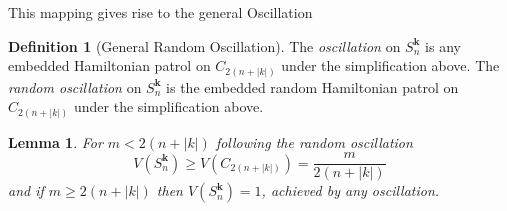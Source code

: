 \documentclass[a4paper,10pt]{article}
\newtheorem{lemma}[theorem]{Lemma}
\theoremstyle{definition}
\newtheorem{definition}[theorem]{Definition}
\theoremstyle{definition}
\theoremstyle{remark}
\theoremstyle{definition}
\begin{document}
This mapping gives rise to the general Oscillation

\begin{definition}[General Random Oscillation]
The \textit{oscillation} on $S^{\bm{k}}_{n}$ is any embedded Hamiltonian patrol on $C_{2(n+|k|)}$ under the simplification above. The \textit{random oscillation} on $S^{\bm{k}}_{n}$ is the embedded random Hamiltonian patrol on $C_{2(n+|k|)}$ under the simplification above.
\end{definition}

\begin{lemma}
For $m < 2(n+|k|)$ following the random oscillation
$$V(S^{\bm{k}}_{n}) \geq V(C_{2(n+|k|)})=\frac{m}{2(n+|k|)}$$
and if $m \geq 2(n+|k|)$ then $V(S^{\bm{k}}_{n})=1$, achieved by any oscillation. 
\end{lemma}
\end{document}

